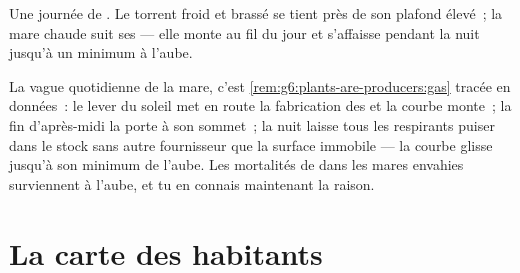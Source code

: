 \begin{omfigure}

{\small Une journée de . Le torrent froid et
brassé se tient près de son plafond élevé~; la mare chaude suit ses
 --- elle monte au fil du jour et s'affaisse pendant la
nuit jusqu'à un minimum à l'aube.}
\end{omfigure}

\begin{example}\label{ex:g7:oxygen-in-the-water:curve}
La vague quotidienne de la mare, c'est
\cref{rem:g6:plants-are-producers:gas} tracée en données~: le lever
du soleil met en route la fabrication des  et la courbe
monte~; la fin d'après-midi la porte à son sommet~; la nuit laisse
tous les respirants puiser dans le stock sans autre fournisseur que
la surface immobile --- la courbe glisse jusqu'à son minimum de
l'aube. Les mortalités de  dans les mares envahies
surviennent à l'aube, et tu en connais maintenant la raison.
\end{example}

\section{La carte des habitants}

